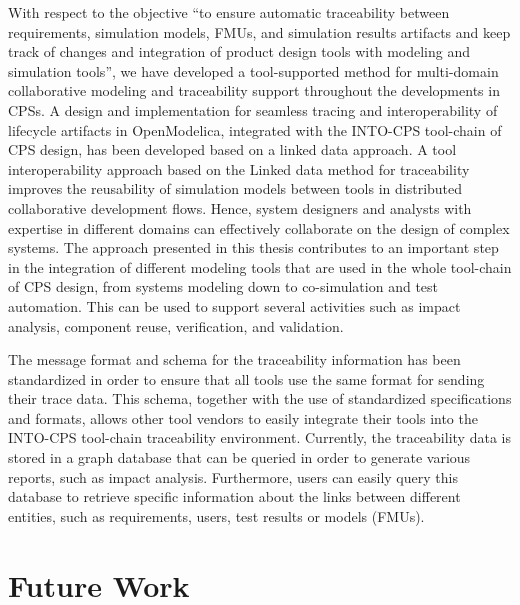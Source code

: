 With respect to the objective “to ensure automatic traceability between requirements, simulation models, FMUs, and simulation results artifacts and keep track of changes and integration of product design tools with modeling and simulation tools”, we have developed a tool-supported method for multi-domain collaborative modeling and traceability support throughout the developments in CPSs. A design and implementation for seamless tracing and interoperability of lifecycle artifacts in OpenModelica, integrated with the INTO-CPS tool-chain of CPS design, has been developed based on a linked data approach. A tool interoperability approach based on the Linked data method for traceability improves the reusability of simulation models between tools in distributed collaborative development flows. Hence, system designers and analysts with expertise in different domains can effectively collaborate on the design of complex systems. The approach presented in this thesis contributes to an important step in the integration of different modeling tools that are used in the whole tool-chain of CPS design, from systems modeling down to co-simulation and test automation. This can be used to support several activities such as impact analysis, component reuse, verification, and validation. 

The message format and schema for the traceability information has been standardized in order to ensure that all tools use the same format for sending their trace data. This schema, together with the use of standardized specifications and formats, allows other tool vendors to easily integrate their tools into the INTO-CPS tool-chain traceability environment. Currently, the traceability data is stored in a graph database that can be queried in order to generate various reports, such as impact analysis. Furthermore, users can easily query this database to retrieve specific information about the links between different entities, such as requirements, users, test results or models (FMUs).

\section{Future Work}
\label{sec:futurework}





